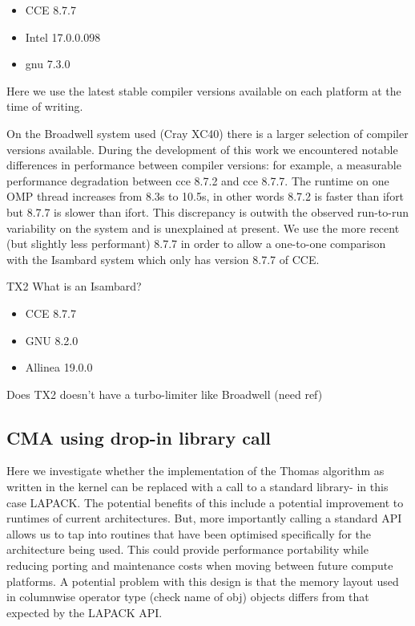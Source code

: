 \begin{itemize}
\item CCE 8.7.7
\item Intel 17.0.0.098
\item gnu 7.3.0
\end{itemize}

Here we use the latest stable compiler versions available on each platform at the time of writing.

On the Broadwell system used (Cray XC40) there is a larger selection of compiler versions available. During the development of this work we encountered notable differences in performance between compiler versions: for example, a measurable performance degradation between cce 8.7.2 and cce 8.7.7. The runtime on one OMP thread increases from 8.3s to 10.5s, in other words 8.7.2 is faster than ifort but 8.7.7 is slower than ifort. This discrepancy is outwith the observed run-to-run variability on the system and is unexplained at present. We use the more recent (but slightly less performant) 8.7.7 in order to allow a one-to-one comparison with the Isambard system which only has version 8.7.7 of CCE.


TX2
What is an Isambard?
\begin{itemize}
\item CCE 8.7.7
\item GNU 8.2.0
\item Allinea 19.0.0
\end{itemize}

Does TX2 doesn't have a turbo-limiter like Broadwell (need ref)

\subsection{CMA using drop-in library call}
Here we investigate whether the implementation of the Thomas algorithm as written in the kernel can be replaced with a call to a standard library- in this case LAPACK. The potential benefits of this include a potential improvement to runtimes of current architectures. But, more importantly calling a standard API allows us to tap into routines that have been optimised specifically for the architecture being used. This could provide performance portability while reducing porting and maintenance costs when moving between future compute platforms.
A potential problem with this design is that the memory layout used in columnwise operator type (check name of obj) objects differs from that expected by the LAPACK API.

